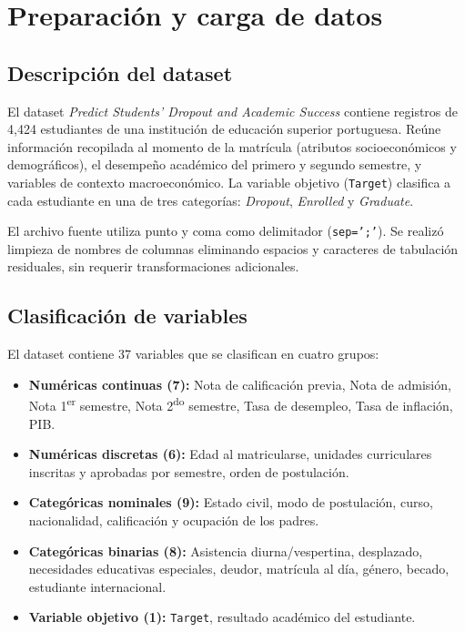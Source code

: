 \documentclass[11pt,a4paper]{article}
\begin{document}
\vspace{0.5em}
\tableofcontents
\newpage

\section{Preparación y carga de datos}

\subsection{Descripción del dataset}

El dataset \textit{Predict Students' Dropout and Academic Success} \cite{realinho2022} contiene registros de 4,424 estudiantes de una institución de educación superior portuguesa. Reúne información recopilada al momento de la matrícula (atributos socioeconómicos y demográficos), el desempeño académico del primero y segundo semestre, y variables de contexto macroeconómico. La variable objetivo (\texttt{Target}) clasifica a cada estudiante en una de tres categorías: \textit{Dropout}, \textit{Enrolled} y \textit{Graduate}.

El archivo fuente utiliza punto y coma como delimitador (\texttt{sep=';'}). Se realizó limpieza de nombres de columnas eliminando espacios y caracteres de tabulación residuales, sin requerir transformaciones adicionales.

\subsection{Clasificación de variables}

El dataset contiene 37 variables que se clasifican en cuatro grupos:

\begin{itemize}[noitemsep]
    \item \textbf{Numéricas continuas (7):} Nota de calificación previa, Nota de admisión, Nota 1\textsuperscript{er} semestre, Nota 2\textsuperscript{do} semestre, Tasa de desempleo, Tasa de inflación, PIB.
    \item \textbf{Numéricas discretas (6):} Edad al matricularse, unidades curriculares inscritas y aprobadas por semestre, orden de postulación.
    \item \textbf{Categóricas nominales (9):} Estado civil, modo de postulación, curso, nacionalidad, calificación y ocupación de los padres.
    \item \textbf{Categóricas binarias (8):} Asistencia diurna/vespertina, desplazado, necesidades educativas especiales, deudor, matrícula al día, género, becado, estudiante internacional.
    \item \textbf{Variable objetivo (1):} \texttt{Target},  resultado académico del estudiante.
\end{itemize}
\end{document}

